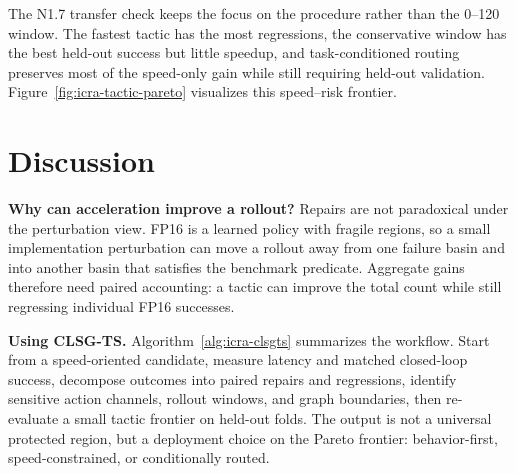 \documentclass[letterpaper,10pt,twocolumn]{article}
\begin{document}
\begin{table}[H]
\centering
\caption{N1.7 held-out transfer check on 15 task-initialization pairs. Repairs and regressions are paired against FP16.}
\label{tab:icra-n17}
\scriptsize
\setlength{\tabcolsep}{2pt}
\end{table}

The N1.7 transfer check keeps the focus on the procedure rather than the 0--120 window. The fastest tactic has the most regressions, the conservative window has the best held-out success but little speedup, and task-conditioned routing preserves most of the speed-only gain while still requiring held-out validation. Figure~\ref{fig:icra-tactic-pareto} visualizes this speed--risk frontier.

\section{Discussion}

\textbf{Why can acceleration improve a rollout?}
Repairs are not paradoxical under the perturbation view. FP16 is a learned policy with fragile regions, so a small implementation perturbation can move a rollout away from one failure basin and into another basin that satisfies the benchmark predicate. Aggregate gains therefore need paired accounting: a tactic can improve the total count while still regressing individual FP16 successes.

\textbf{Using CLSG-TS.}
Algorithm~\ref{alg:icra-clsgts} summarizes the workflow. Start from a speed-oriented candidate, measure latency and matched closed-loop success, decompose outcomes into paired repairs and regressions, identify sensitive action channels, rollout windows, and graph boundaries, then re-evaluate a small tactic frontier on held-out folds. The output is not a universal protected region, but a deployment choice on the Pareto frontier: behavior-first, speed-constrained, or conditionally routed.
\end{document}
